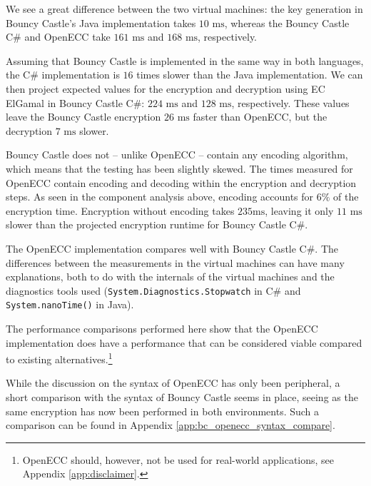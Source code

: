 We see a great difference between the two virtual machines: the key generation in Bouncy Castle's Java implementation takes
\(10 \text{ ms}\), whereas the Bouncy Castle C\# and OpenECC take \(161 \text{ ms}\) and \(168 \text{ ms}\), respectively.

Assuming that Bouncy Castle is implemented in the same way in both languages, the C\# implementation is \(16\) times slower
than the Java implementation. We can then project expected values for the encryption and decryption using EC ElGamal in Bouncy
Castle C\#: \(224 \text{ ms}\) and \(128 \text{ ms}\), respectively. These values leave the Bouncy Castle encryption \(26 \text{ ms}\)
faster than OpenECC, but the decryption \(7 \text{ ms}\) slower.

Bouncy Castle does not -- unlike OpenECC -- contain any encoding algorithm, which means that the testing has been slightly skewed.
The times measured for OpenECC contain encoding and decoding within the encryption and decryption steps. As seen in the component
analysis above, encoding accounts for \(6\%\) of the encryption time. Encryption without encoding takes \(235 \text{ms}\), leaving it
only \(11 \text{ ms}\) slower than the projected encryption runtime for Bouncy Castle C\#.

The OpenECC implementation compares well with Bouncy Castle C\#. The differences between the measurements in the virtual machines
can have many explanations, both to do with the internals of the virtual machines and the diagnostics tools used
(\texttt{System.Diagnostics.Stopwatch} in C\# and \texttt{System.nanoTime()} in Java).

The performance comparisons performed here show that the OpenECC implementation does have a performance that can be considered viable
compared to existing alternatives.\footnote{OpenECC should, however, not be used for real-world applications, see Appendix
\ref{app:disclaimer}.}

While the discussion on the syntax of OpenECC has only been peripheral, a short comparison with the syntax of Bouncy Castle seems in place,
seeing as the same encryption has now been performed in both environments. Such a comparison can be found in Appendix \ref{app:bc_openecc_syntax_compare}.
